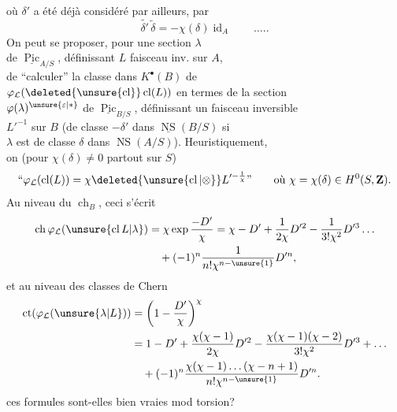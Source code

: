 où $\delta'$  a été déjà considéré par ailleurs, par
\[
\widetilde{\delta'}\,\widetilde\delta=-\chi(\delta)\operatorname{id}_A\qquad\ldots..
\]
On peut se proposer, pour une section $\lambda$\\
de $\underline{\operatorname{Pic}}_{A/S}$, définissant $L$ faisceau inv. sur $A$,\\
de ``calculer'' la classe dans $K^\bullet(B)$ de\\
$\varphi_{\mathcal L}(\deleted{\unsure{\operatorname{cl}}}\operatorname{cl}(L))$ en termes de  la section\\
$\varphi(\lambda)^{\unsure{\varepsilon|*}}$ de $\underline{\operatorname{Pic}}_{B/S}$, définissant un faisceau inversible\\
$L'^{-1}$ sur $B$ (de classe $-\delta'$ dans $\underline{\operatorname{NS}}(B/S)$ si\\
$\lambda$ est de classe $\delta$ dans $\operatorname{NS}(A/S)$). Heuristiquement,\\
on   (pour $\chi(\delta)\neq0$ partout sur $S$)
\[
\text{``}\varphi_{\mathcal L}(\operatorname{cl}(L))=\chi\deleted{\unsure{\operatorname{cl}|\otimes}}L'^{-\frac1\chi}\text{''}
\qquad\text{où }\chi=\chi(\delta)\in H^0(S,\mathbf Z).
\]
Au niveau du $\operatorname{ch}_B$, ceci s'écrit
\[
\begin{aligned}
\operatorname{ch}\varphi_{\mathcal L}(\unsure{\operatorname{cl}L|\lambda})
&=\chi\exp\frac{-D'}\chi
=\chi-D'+\frac1{2\chi}D'^2-\frac1{3!\chi^2}D'^3\ldots\\
&\quad+(-1)^n\frac1{n!\chi^{n-\unsure{1}}}D'^n,
\end{aligned}
\]
et au niveau des classes de Chern 
\[
\begin{aligned}
\operatorname{ct}(\varphi_{\mathcal L}(\unsure{\lambda|L}))&=\left(1-\frac{D'}\chi\right)^\chi\\
&=1-D'+\frac{\chi(\chi-1)}{2\chi}D'^2
-\frac{\chi(\chi-1)(\chi-2)}{3!\chi^2}D'^3+\ldots\\
&\quad+(-1)^n\frac{\chi(\chi-1)\ldots(\chi-n+1)}{n!\chi^{n-\unsure{1}}}D'^n.
\end{aligned}
\]
ces formules sont-elles bien vraies mod torsion?

